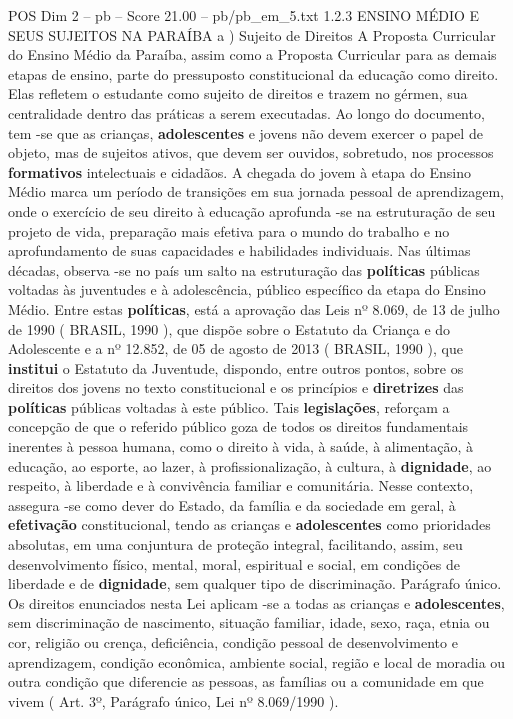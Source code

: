 \begin{textsample}{POS Dim 2 – pb – Score 21.00 – pb/pb\_em\_5.txt}  \label{ex:f2_pos_276}
1.2.3 ENSINO MÉDIO E SEUS SUJEITOS NA PARAÍBA a ) Sujeito de Direitos A Proposta Curricular do Ensino Médio da Paraíba, assim como a Proposta Curricular para as demais etapas de ensino, parte do pressuposto constitucional da educação como direito.
Elas refletem o estudante como sujeito de direitos e trazem no gérmen, sua centralidade dentro das práticas a serem executadas.
Ao longo do documento, tem -se que as crianças, \textbf{adolescentes} e jovens não devem exercer o papel de objeto, mas de sujeitos ativos, que devem ser ouvidos, sobretudo, nos processos \textbf{formativos} intelectuais e cidadãos.
A chegada do jovem à etapa do Ensino Médio marca um período de transições em sua jornada pessoal de aprendizagem, onde o exercício de seu direito à educação aprofunda -se na estruturação de seu projeto de vida, preparação mais efetiva para o mundo do trabalho e no aprofundamento de suas capacidades e habilidades individuais.
Nas últimas décadas, observa -se no país um salto na estruturação das \textbf{políticas} públicas voltadas às juventudes e à adolescência, público específico da etapa do Ensino Médio.
Entre estas \textbf{políticas}, está a aprovação das Leis nº 8.069, de 13 de julho de 1990 ( BRASIL, 1990 ), que dispõe sobre o Estatuto da Criança e do Adolescente e a nº 12.852, de 05 de agosto de 2013 ( BRASIL, 1990 ), que \textbf{institui} o Estatuto da Juventude, dispondo, entre outros pontos, sobre os direitos dos jovens no texto constitucional e os princípios e \textbf{diretrizes} das \textbf{políticas} públicas voltadas à este público.
Tais \textbf{legislações}, reforçam a concepção de que o referido público goza de todos os direitos fundamentais inerentes à pessoa humana, como o direito à vida, à saúde, à alimentação, à educação, ao esporte, ao lazer, à profissionalização, à cultura, à \textbf{dignidade}, ao respeito, à liberdade e à convivência familiar e comunitária.
Nesse contexto, assegura -se como dever do Estado, da família e da sociedade em geral, à \textbf{efetivação} constitucional, tendo as crianças e \textbf{adolescentes} como prioridades absolutas, em uma conjuntura de proteção integral, facilitando, assim, seu desenvolvimento físico, mental, moral, espiritual e social, em condições de liberdade e de \textbf{dignidade}, sem qualquer tipo de discriminação.
Parágrafo único.
Os direitos enunciados nesta Lei aplicam -se a todas as crianças e \textbf{adolescentes}, sem discriminação de nascimento, situação familiar, idade, sexo, raça, etnia ou cor, religião ou crença, deficiência, condição pessoal de desenvolvimento e aprendizagem, condição econômica, ambiente social, região e local de moradia ou outra condição que diferencie as pessoas, as famílias ou a comunidade em que vivem ( Art. 3º, Parágrafo único, Lei nº 8.069/1990 ).

\end{textsample}
